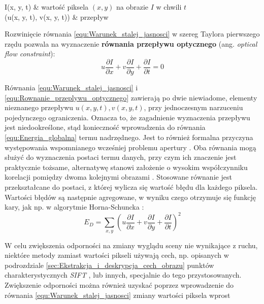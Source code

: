 \begin{conditions}
	I(x, y, t) & wartość piksela $(x, y)$ na obrazie $I$ w chwili $t$ \\
	(u(x, y, t), v(x, y, t)) & przepływ \\
\end{conditions}

Rozwinięcie równania \ref{equ:Warunek_stalej_jasnosci} w szereg Taylora pierwszego rzędu pozwala na wyznaczenie \textbf{równania przepływu optycznego} (ang. \textit{optical flow constraint}):
\begin{equation}
\label{equ:Rownanie_przeplywu_optycznego}
	u \frac{\partial I}{\partial x} + v \frac{\partial I}{\partial y} + \frac{\partial I}{\partial t} = 0
\end{equation}

Równania \ref{equ:Warunek_stalej_jasnosci} i \ref{equ:Rownanie_przeplywu_optycznego} zawierają po dwie niewiadome, elementy nieznanego przepływu $u(x, y, t), v(x, y, t)$, przy jednoczesnym narzuceniu pojedynczego ograniczenia. Oznacza to, że zagadnienie wyznaczenia przepływu jest niedookreślone, stąd konieczność wprowadzenia do równania \ref{equ:Energia_globalna} termu nadrzędnego. Jest to również formalna przyczyna występowania wspomnianego wcześniej problemu apertury \cite{Baker2011}. Oba równania mogą służyć do wyznaczenia postaci termu danych, przy czym ich znaczenie jest praktycznie tożsame, alternatywę stanowi założenie o wysokim współczynniku korelacji pomiędzy dwoma kolejnymi obrazami \cite{Baker2011}. Stosowane równanie jest przekształcane do postaci, z której wylicza się wartość błędu dla każdego piksela. Wartości błędów są następnie agregowane, w wyniku czego otrzymuje się funkcję kary, jak np. w algorytmie Horna-Schuncka \cite{Horn1981} \cite{Baker2011} \cite{Karasulu2013}:
\begin{equation}
\label{equ:Funkcja_kary}
	E_D = \sum\limits_{x,y} (u \frac{\partial I}{\partial x} + v \frac{\partial I}{\partial y} + \frac{\partial I}{\partial t})^2
\end{equation}

W celu zwiększenia odporności na zmiany wyglądu sceny nie wynikające z ruchu, niektóre metody zamiast wartości pikseli używają cech, np. opisanych w podrozdziale \ref{sec:Ekstrakcja_i_deskrypcja_cech_obrazu} punktów charakterystycznych \textit{SIFT} \cite{Baker2011}, lub innych, specjalnie do tego przystosowanych. 
Zwiększenie odporności można również uzyskać poprzez wprowadzenie do równania \ref{equ:Warunek_stalej_jasnosci} zmiany wartości piksela wprost \cite{Baker2011}

